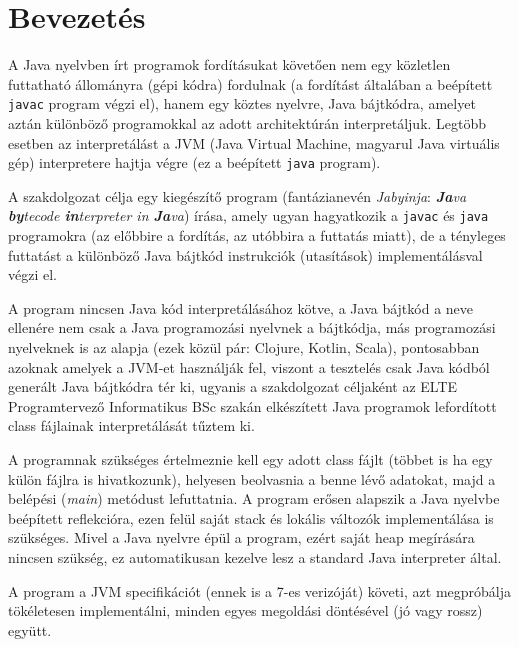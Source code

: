 \chapter{Bevezetés}
\label{ch:intro}

A Java nyelvben írt programok fordításukat követően nem egy közletlen futtatható állományra (gépi kódra) fordulnak (a fordítást általában a beépített \lstinline{javac} program végzi el), hanem egy köztes nyelvre, Java bájtkódra, amelyet aztán különböző programokkal az adott architektúrán interpretáljuk. Legtöbb esetben az interpretálást a JVM (Java Virtual Machine, magyarul Java virtuális gép) interpretere hajtja végre (ez a beépített \lstinline{java} program).

A szakdolgozat célja egy kiegészítő program (fantázianevén \textit{Jabyinja}: \textit{\textbf{Ja}va \textbf{by}tecode \textbf{in}terpreter in \textbf{Ja}va}) írása, amely ugyan hagyatkozik a \lstinline{javac} és \lstinline{java} programokra (az előbbire a fordítás, az utóbbira a futtatás miatt), de a tényleges futtatást a különböző Java bájtkód instrukciók (utasítások) implementálásval végzi el.

A program nincsen Java kód interpretálásához kötve, a Java bájtkód a neve ellenére nem csak a Java programozási nyelvnek a bájtkódja, más programozási nyelveknek is az alapja (ezek közül pár: Clojure, Kotlin, Scala), pontosabban azoknak amelyek a JVM-et használják fel, viszont a tesztelés csak Java kódból generált Java bájtkódra tér ki, ugyanis a szakdolgozat céljaként az ELTE Programtervező Informatikus BSc szakán elkészített Java programok lefordított class fájlainak interpretálását tűztem ki.

A programnak szükséges értelmeznie kell egy adott class fájlt (többet is ha egy külön fájlra is hivatkozunk), helyesen beolvasnia a benne lévő adatokat, majd a belépési (\textit{main}) metódust lefuttatnia. A program erősen alapszik a Java nyelvbe beépített reflekcióra, ezen felül saját stack és lokális változók implementálása is szükséges. Mivel a Java nyelvre épül a program, ezért saját heap megírására nincsen szükség, ez automatikusan kezelve lesz a standard Java interpreter által.

A program a JVM specifikációt\cite{jvmspecification} (ennek is a 7-es verizóját) követi, azt megpróbálja tökéletesen implementálni, minden egyes megoldási döntésével (jó vagy rossz) együtt.